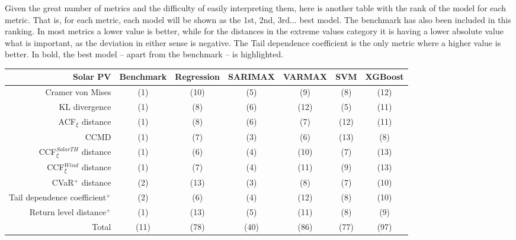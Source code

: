 Given the great number of metrics and the difficulty of easily interpreting them, here is another table with the rank of the model for each metric. That is, for each metric, each model will be shown as the 1st, 2nd, 3rd... best model. The benchmark has also been included in this ranking. In most metrics a lower value is better, while for the distances in the extreme values category it is having a lower absolute value what is important, as the deviation in either sense is negative. The Tail dependence coefficient is the only metric where a higher value is better. In bold, the best model -- apart from the benchmark -- is highlighted. 
\newpage
\begin{table}[ht]
    \footnotesize
    \begin{tabular}[l]{r|c|ccc|cc|}
        \toprule
        \textbf{Solar PV} &Benchmark&Regression&SARIMAX&VARMAX&SVM&XGBoost \\
        \midrule            
        Cramer von Mises&(1)&(10)&(5)&(9)&(8)&(12) \\
        KL divergence&(1)&(8)&(6)&(12)&(5)&(11) \\
        ACF$_\xi$ distance&(1)&(8)&(6)&(7)&(12)&(11) \\
        \midrule
        CCMD&(1)&(7)&(3)&(6)&(13)&(8) \\
        CCF$_\xi^{Solar TH}$ distance&(1)&(6)&(4)&(10)&(7)&(13) \\
        CCF$_\xi^{Wind}$ distance&(1)&(7)&(4)&(11)&(9)&(13) \\
        \midrule
        CVaR$^+$ distance&(2)&(13)&(3)&(8)&(7)&(10) \\
        Tail dependence coefficient$^+$&(2)&(6)&(4)&(12)&(8)&(10) \\
        Return level distance$^+$&(1)&(13)&(5)&(11)&(8)&(9) \\
        \bottomrule
        Total&(11)&(78)&(40)&(86)&(77)&(97) \\
        \bottomrule
    \end{tabular}
\end{table}
